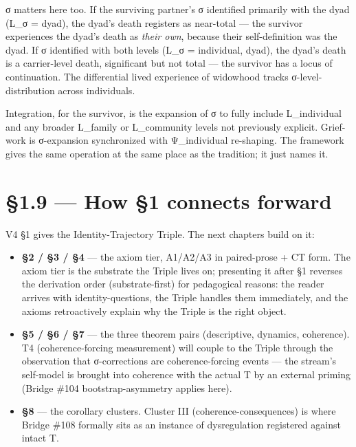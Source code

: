 \documentclass[11pt, openany]{book}
\newcommand{\sectionbreak}{\clearpage}
\begin{document}
σ matters here too. If the surviving partner's σ identified primarily with the dyad (L\_\allowbreak{}σ = {dyad}), the dyad's death registers as near-total --- the survivor experiences the dyad's death as \textit{their own}, because their self-definition was the dyad. If σ identified with both levels (L\_\allowbreak{}σ = {individual, dyad}), the dyad's death is a carrier-level death, significant but not total --- the survivor has a locus of continuation. The differential lived experience of widowhood tracks σ-level-distribution across individuals.

Integration, for the survivor, is the expansion of σ to fully include L\_\allowbreak{}individual and any broader L\_\allowbreak{}family or L\_\allowbreak{}community levels not previously explicit. Grief-work is σ-expansion synchronized with Ψ\_\allowbreak{}individual re-shaping. The framework gives the same operation at the same place as the tradition; it just names it.

\sectionbreak

\section{§1.9 --- How §1 connects forward}

V4 §1 gives the Identity-Trajectory Triple. The next chapters build on it:

\begin{itemize}
\item \textbf{§2 / §3 / §4} --- the axiom tier, A1/A2/A3 in paired-prose + CT form. The axiom tier is the substrate the Triple lives on; presenting it after §1 reverses the derivation order (substrate-first) for pedagogical reasons: the reader arrives with identity-questions, the Triple handles them immediately, and the axioms retroactively explain why the Triple is the right object.
\end{itemize}

\begin{itemize}
\item \textbf{§5 / §6 / §7} --- the three theorem pairs (descriptive, dynamics, coherence). T4 (coherence-forcing measurement) will couple to the Triple through the observation that σ-corrections are coherence-forcing events --- the stream's self-model is brought into coherence with the actual T by an external priming (Bridge \#104 bootstrap-asymmetry applies here).
\end{itemize}

\begin{itemize}
\item \textbf{§8} --- the corollary clusters. Cluster III (coherence-consequences) is where Bridge \#108 formally sits as an instance of dysregulation registered against intact T.
\end{itemize}
\end{document}

